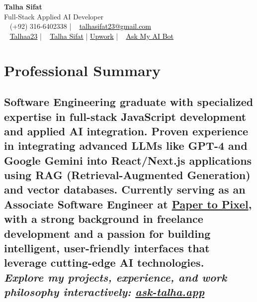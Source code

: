 \documentclass[a4,10pt]{article}
\begin{document}

\begin{center}
    {\Huge \textbf{Talha Sifat}} \\[0.15cm]
    {\color{UI_blue} \Large Full-Stack Applied AI Developer} \\[0.25cm]
    \faPhone~ (+92) 316-6402338 \enspace | \enspace
    \faEnvelope~ \href{mailto:talhasifat23@gmail.com}{\textcolor{black}{\underline{talhasifat23@gmail.com}}} \\[0.1cm]
   \faGithub~ \href{https://github.com/TALHAA23}{\textcolor{black}{\underline{Talhaa23}}} \enspace | \enspace
\faLinkedin~ \href{https://www.linkedin.com/in/talha-sifat-04410b238/}{\textcolor{black}{\underline{Talha Sifat}}} \enspace | \enspace
\href{https://www.upwork.com/freelancers/~014857361c14554206}{\textcolor{black}{\underline{Upwork}}} \enspace | \enspace
\faRobot~ \href{https://ask-talha.vercel.app/}{\textcolor{black}{\underline{Ask My AI Bot}}}



\end{center}

\vspace{-0.70cm}

\section{Professional Summary}
\subsection*{{\normalsize \normalfont 
Software Engineering graduate with specialized expertise in \textbf{full-stack JavaScript development} and \textbf{applied AI integration}. Proven experience in integrating advanced LLMs like \textbf{GPT-4} and \textbf{Google Gemini} into React/Next.js applications using \textbf{RAG (Retrieval-Augmented Generation)} and vector databases. Currently serving as an \textbf{Associate Software Engineer} at \href{https://papertopixel.co/}{Paper to Pixel}, with a strong background in freelance development and a passion for building intelligent, user-friendly interfaces that leverage cutting-edge AI technologies. \\[0.15cm]
\textit{Explore my projects, experience, and work philosophy interactively: \href{https://ask-talha.vercel.app/}{ask-talha.app}}
}} 

\vspace{0.2cm}
\end{document}
